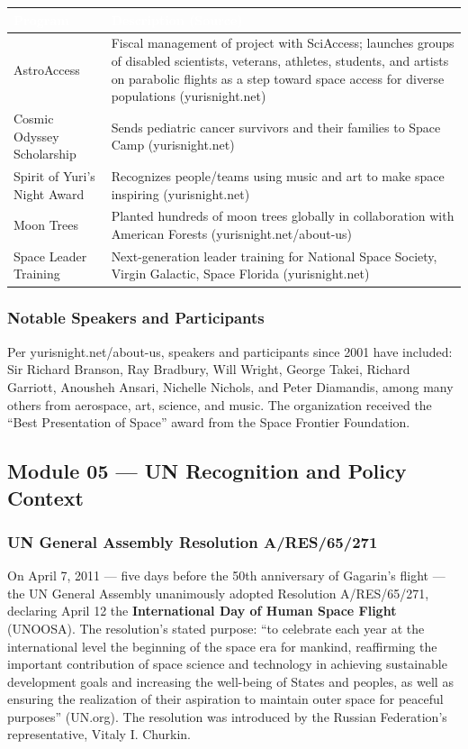 \documentclass[11pt,letterpaper]{article}
\newcommand{\tableheader}[1]{\textbf{\sffamily\textcolor{white}{#1}}}
\begin{document}
\begin{center}
\begin{tabularx}{\textwidth}{L{4cm}X}
\toprule
{}
\tableheader{Program} & \tableheader{Description (Source)} \\
\midrule
AstroAccess & Fiscal management of project with SciAccess; launches groups of disabled scientists, veterans, athletes, students, and artists on parabolic flights as a step toward space access for diverse populations (yurisnight.net) \\
Cosmic Odyssey Scholarship & Sends pediatric cancer survivors and their families to Space Camp (yurisnight.net) \\
Spirit of Yuri's Night Award & Recognizes people/teams using music and art to make space inspiring (yurisnight.net) \\
Moon Trees & Planted hundreds of moon trees globally in collaboration with American Forests (yurisnight.net/about-us) \\
Space Leader Training & Next-generation leader training for National Space Society, Virgin Galactic, Space Florida (yurisnight.net) \\
\bottomrule
\end{tabularx}
\end{center}

\subsubsection{Notable Speakers and Participants}

Per yurisnight.net/about-us, speakers and participants since 2001 have included: Sir Richard Branson, Ray Bradbury, Will Wright, George Takei, Richard Garriott, Anousheh Ansari, Nichelle Nichols, and Peter Diamandis, among many others from aerospace, art, science, and music. The organization received the ``Best Presentation of Space'' award from the Space Frontier Foundation.

\subsection{Module 05 — UN Recognition and Policy Context}

\subsubsection{UN General Assembly Resolution A/RES/65/271}

On April 7, 2011 — five days before the 50th anniversary of Gagarin's flight — the UN General Assembly unanimously adopted Resolution A/RES/65/271, declaring April 12 the \textbf{International Day of Human Space Flight} (UNOOSA). The resolution's stated purpose: ``to celebrate each year at the international level the beginning of the space era for mankind, reaffirming the important contribution of space science and technology in achieving sustainable development goals and increasing the well-being of States and peoples, as well as ensuring the realization of their aspiration to maintain outer space for peaceful purposes'' (UN.org). The resolution was introduced by the Russian Federation's representative, Vitaly I. Churkin.
\end{document}
